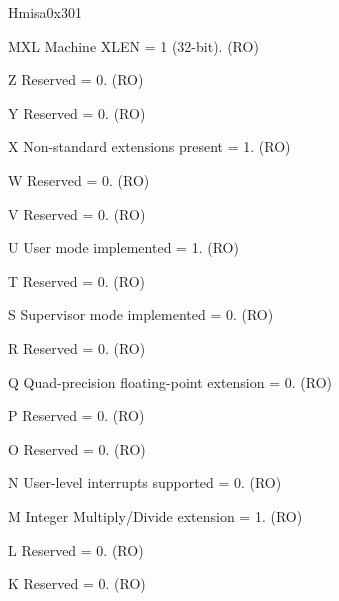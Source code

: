 \begin{register}{H}{misa}{0x301}\label{regdesc:MISA}
%
%
%
%
%
%
%
%
%
%
%
%
%
%
%
%
%
%
%
%
%
%
%
%
%
%
%
%
\regnewline%
\begin{regdesc}\begin{reglist}
\label{fielddesc:MISAMXL}\item [MXL] Machine XLEN = 1 (32-bit). (RO)
\label{fielddesc:MISAZ}\item [Z] Reserved = 0. (RO)
\label{fielddesc:MISAY}\item [Y] Reserved = 0. (RO)
\label{fielddesc:MISAX}\item [X] Non-standard extensions present = 1. (RO)
\label{fielddesc:MISAW}\item [W] Reserved = 0. (RO)
\label{fielddesc:MISAV}\item [V] Reserved = 0. (RO)
\label{fielddesc:MISAU}\item [U] User mode implemented = 1. (RO)
\label{fielddesc:MISAT}\item [T] Reserved = 0. (RO)
\label{fielddesc:MISAS}\item [S] Supervisor mode implemented = 0. (RO)
\label{fielddesc:MISAR}\item [R] Reserved = 0. (RO)
\label{fielddesc:MISAQ}\item [Q] Quad-precision floating-point extension = 0. (RO)
\label{fielddesc:MISAP}\item [P] Reserved = 0. (RO)
\label{fielddesc:MISAO}\item [O] Reserved = 0. (RO)
\label{fielddesc:MISAN}\item [N] User-level interrupts supported = 0. (RO)
\label{fielddesc:MISAM}\item [M] Integer Multiply/Divide extension = 1. (RO)
\label{fielddesc:MISAL}\item [L] Reserved = 0. (RO)
\label{fielddesc:MISAK}\item [K] Reserved = 0. (RO)

\end{reglist}
\end{regdesc}
\end{register}
